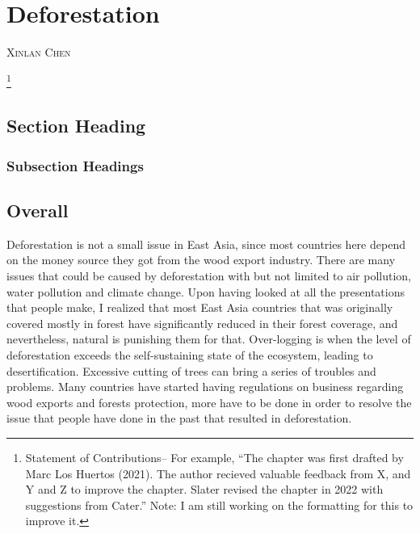 \documentclass{book}\usepackage{knitr}
\makeatletter
\newcommand{\chapterauthor}[1]{%
  {\parindent0pt\vspace*{-25pt}%
  \linespread{1.1}\large\scshape#1%
  \par\nobreak\vspace*{35pt}}
  \@afterheading%
}
\makeatother
\begin{document}
\chapter{Deforestation}\label{ch:deforestation}

\chapterauthor{Xinlan Chen}

\footnote{Statement of Contributions-- For example, ``The chapter was first drafted by Marc Los Huertos (2021). The author recieved valuable feedback from X, and Y and Z to improve the chapter. Slater revised the chapter in 2022 with suggestions from Cater.'' Note: I am still working on the formatting for this to improve it.}

\section{Section Heading}%

\subsection{Subsection Headings} %





\section{Overall}
Deforestation is not a small issue in East Asia, since most countries here depend on the money source they got from the wood export industry. There are many issues that could be caused by deforestation with but not limited to air pollution, water pollution and climate change. Upon having looked at all the presentations that people make, I realized that most East Asia countries that was originally covered mostly in forest have significantly reduced in their forest coverage, and nevertheless, natural is punishing them for that. Over-logging is when the level of deforestation exceeds the self-sustaining state of the ecosystem, leading to desertification. Excessive cutting of trees can bring a series of troubles and problems. Many countries have started having regulations on business regarding wood exports and forests protection, more have to be done in order to resolve the issue that people have done in the past that resulted in deforestation. 
\end{document}
